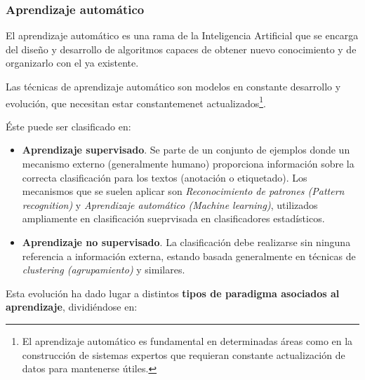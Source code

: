 \documentclass[a4paper, 11pt, titlepage]{article}
\begin{document}
        \subsubsection{Aprendizaje automático}

            El aprendizaje automático es una rama de la Inteligencia Artificial que se encarga 
            del diseño y desarrollo de algoritmos capaces de obtener nuevo conocimiento y de 
            organizarlo con el ya existente.

            Las técnicas de aprendizaje automático son modelos en constante desarrollo y evolución, 
            que necesitan estar constantemenet actualizados\footnote{
                El aprendizaje automático es fundamental en determinadas áreas como en la construcción 
                de sistemas expertos que requieran constante actualización de datos para mantenerse útiles.
            }.

            Éste puede ser clasificado en:

            \begin{itemize}
                \item \textbf{Aprendizaje supervisado}. Se parte de un conjunto de ejemplos 
                donde un mecanismo externo (generalmente humano) proporciona información sobre 
                la correcta clasificación para los textos (anotación o etiquetado). Los mecanismos 
                que se suelen aplicar son \textit{Reconocimiento de patrones (Pattern recognition)}
                y \textit{Aprendizaje automático (Machine learning)}, utilizados ampliamente en 
                clasificación sueprvisada en clasificadores estadísticos.
                \item \textbf{Aprendizaje no supervisado}. La clasificación debe realizarse sin 
                ninguna referencia a información externa, estando basada generalmente en técnicas 
                de \textit{clustering (agrupamiento)} y similares.
            \end{itemize}

            Esta evolución ha dado lugar a distintos \textbf{tipos de paradigma asociados al 
            aprendizaje}, dividiéndose en:
\end{document}
